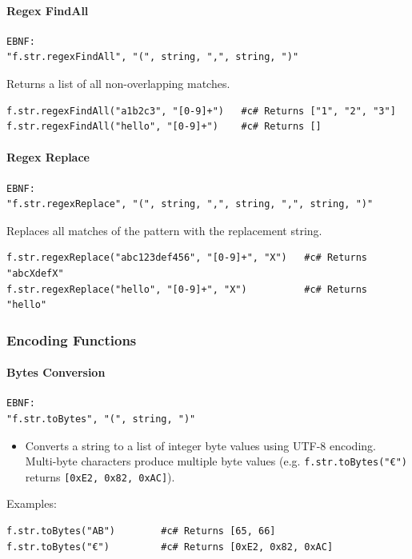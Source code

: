 \paragraph{Regex FindAll}
\begin{verbatim}
EBNF:
"f.str.regexFindAll", "(", string, ",", string, ")"
\end{verbatim}
Returns a list of all non-overlapping matches.
\begin{verbatim}
f.str.regexFindAll("a1b2c3", "[0-9]+")   #c# Returns ["1", "2", "3"]
f.str.regexFindAll("hello", "[0-9]+")    #c# Returns []
\end{verbatim}

\paragraph{Regex Replace}
\begin{verbatim}
EBNF:
"f.str.regexReplace", "(", string, ",", string, ",", string, ")"
\end{verbatim}
Replaces all matches of the pattern with the replacement string.
\begin{verbatim}
f.str.regexReplace("abc123def456", "[0-9]+", "X")   #c# Returns "abcXdefX"
f.str.regexReplace("hello", "[0-9]+", "X")          #c# Returns "hello"
\end{verbatim}

\subsubsection{Encoding Functions}
\paragraph{Bytes Conversion}
\begin{verbatim}
EBNF:
"f.str.toBytes", "(", string, ")"
\end{verbatim}
\begin{itemize}
\item Converts a string to a list of integer byte values using UTF-8 encoding. Multi-byte characters produce multiple byte values (e.g. \texttt{f.str.toBytes("€")} returns \texttt{[0xE2, 0x82, 0xAC]}).
\end{itemize}
Examples:
\begin{verbatim}
f.str.toBytes("AB")        #c# Returns [65, 66]
f.str.toBytes("€")         #c# Returns [0xE2, 0x82, 0xAC]
\end{verbatim}

